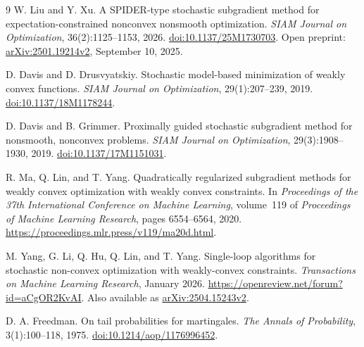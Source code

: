 \documentclass[11pt,a4paper]{article}
\theoremstyle{remark}
\numberwithin{equation}{section}
\begin{document}
\begin{thebibliography}{9}
W. Liu and Y. Xu.
\newblock A SPIDER-type stochastic subgradient method for expectation-constrained nonconvex nonsmooth optimization.
\newblock \emph{SIAM Journal on Optimization}, 36(2):1125--1153, 2026.
\newblock \href{https://doi.org/10.1137/25M1730703}{doi:10.1137/25M1730703}.
\newblock Open preprint: \href{https://arxiv.org/abs/2501.19214v2}{arXiv:2501.19214v2}, September 10, 2025.

D. Davis and D. Drusvyatskiy.
\newblock Stochastic model-based minimization of weakly convex functions.
\newblock \emph{SIAM Journal on Optimization}, 29(1):207--239, 2019.
\newblock \href{https://doi.org/10.1137/18M1178244}{doi:10.1137/18M1178244}.

D. Davis and B. Grimmer.
\newblock Proximally guided stochastic subgradient method for nonsmooth, nonconvex problems.
\newblock \emph{SIAM Journal on Optimization}, 29(3):1908--1930, 2019.
\newblock \href{https://doi.org/10.1137/17M1151031}{doi:10.1137/17M1151031}.

R. Ma, Q. Lin, and T. Yang.
\newblock Quadratically regularized subgradient methods for weakly convex optimization with weakly convex constraints.
\newblock In \emph{Proceedings of the 37th International Conference on Machine Learning}, volume~119 of \emph{Proceedings of Machine Learning Research}, pages 6554--6564, 2020.
\newblock \url{https://proceedings.mlr.press/v119/ma20d.html}.

M. Yang, G. Li, Q. Hu, Q. Lin, and T. Yang.
\newblock Single-loop algorithms for stochastic non-convex optimization with weakly-convex constraints.
\newblock \emph{Transactions on Machine Learning Research}, January 2026.
\newblock \url{https://openreview.net/forum?id=aCgOR2KvAI}.
\newblock Also available as \href{https://arxiv.org/abs/2504.15243v2}{arXiv:2504.15243v2}.

D. A. Freedman.
\newblock On tail probabilities for martingales.
\newblock \emph{The Annals of Probability}, 3(1):100--118, 1975.
\newblock \href{https://doi.org/10.1214/aop/1176996452}{doi:10.1214/aop/1176996452}.
\end{thebibliography}
\end{document}

